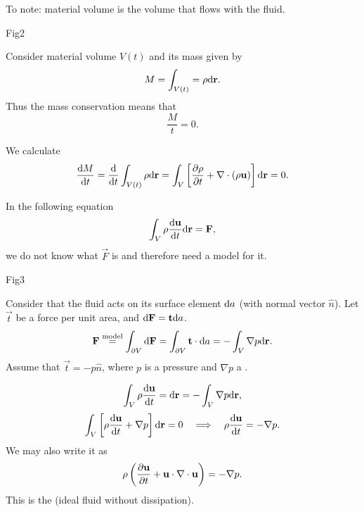 \documentclass[11pt,oneside]{book}
\theoremstyle{definition} %
\theoremstyle{plain} %
\theoremstyle{remark} %
\theoremstyle{underline}
\begin{document}
  To note: material volume is the volume that flows with the fluid.
  
  \todo Fig2

  Consider material volume $V(t)$ and its mass given by
  \begin{displaymath}
    M = \int_{V(t)} = \rho \mathrm{d} \mathbf{r}.
  \end{displaymath}
  Thus the mass conservation means that
  \begin{displaymath}
    \dfrac{M}{t} = 0.
  \end{displaymath}

  We calculate
  \begin{displaymath}
    \frac{\mathrm{d} M}{\mathrm{d} t} = \frac{\mathrm{d} }{\mathrm{d} t} \int_{V(t)} \rho \mathrm{d} \mathbf{r} 
    = \int_V \left[ \frac{\partial \rho}{\partial t} + \nabla \cdot (\rho \mathbf{u}) \right]\mathrm{d} \mathbf{r} 
    = 0.
  \end{displaymath}
  
  In the following equation
  \begin{displaymath}
    \int_V \rho \frac{\mathrm{d} \mathbf{u}}{\mathrm{d} t} \mathrm{d} \mathbf{r} = \mathbf{F},
  \end{displaymath}
  we do not know what $\vec F$ is and therefore need a model for it.

  \todo Fig3

  Consider that the fluid acts on its surface element $\mathrm{d} a$ (with normal vector $\hat n$).
  Let $\vec t$ be a force per unit area, and $\mathrm{d} \mathbf{F} = \mathbf{t} \mathrm{d} a$.
  \begin{displaymath}
    \mathbf{F} \overset{\textrm{model}}{=} \int_{\partial V} \mathrm{d} \mathbf{F} 
    = \int_{\partial V}  \mathbf{t} \cdot \mathrm{d} a
    = - \int_V \nabla p \mathrm{d} \mathbf{r}.
  \end{displaymath}
  Assume that $\vec t = - p \hat{n}$, where $p $ is a pressure and $\nabla p $ a .
  
  \begin{displaymath}
    \int_V \rho \frac{\mathrm{d} \mathbf{u} }{\mathrm{d} t} = \mathrm{d} \mathbf{r} = - \int_V \nabla p \mathrm{d} \mathbf{r},
  \end{displaymath}
  \begin{displaymath}
    \int_V \left[ \rho \frac{\mathrm{d} \mathbf{u}}{\mathrm{d} t} + \nabla p \right]\mathrm{d} \mathbf{r} = 0 
    \quad \Longrightarrow \quad \rho \frac{\mathrm{d}  \mathbf{u} }{\mathrm{d} t} = - \nabla p.
  \end{displaymath}
  We may also write it as 
  \begin{displaymath}
    \rho \left( \frac{\partial \mathbf{u}}{\partial t} + \mathbf{u} \cdot \nabla \cdot \mathbf{u}  \right) = - \nabla p.
  \end{displaymath}
  This is the  (ideal fluid without dissipation).
  
\end{document}
